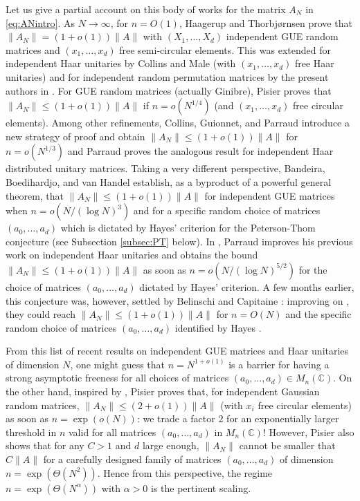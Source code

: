 \documentclass[11pt]{article}
\newcommand{\dC}{\mathbb {C}}
\newcommand{\1}{1\!\!{\sf I}}
\begin{document}
Let us give a partial account on this body of works for the matrix $A_N$ in \eqref{eq:ANintro}. As $N \to \infty$, for $n = O(1)$, Haagerup  and Thorbj{\o}rnsen 
 \cite{MR2183281} prove that $\|A_N\| = (1+o(1)) \| A\|$ with $(X_1,\ldots,X_d)$ independent GUE random matrices and $(x_1,\ldots,x_d)$ free semi-circular elements. This was extended for independent Haar unitaries by Collins and Male \cite{MR3205602} (with $(x_1,\ldots,x_d)$ free Haar unitaries) and for independent random permutation matrices by the present authors in \cite{MR4024563}. For GUE random matrices (actually Ginibre), Pisier \cite{MR4448584} proves that $\|A_N\| \leq (1+o(1)) \| A \|$ if $n = o(N^{1/4})$ (and $(x_1,\ldots,x_d)$ free circular elements). Among other refinements, Collins, Guionnet, and Parraud \cite{MR4445344} introduce a new strategy of proof and obtain $\|A_N\| \leq (1+o(1)) \| A\|$ for $n = o(N^{1/3})$ and Parraud \cite{MR4408503} proves the analogous result for independent Haar distributed unitary matrices. Taking a very different perspective, Bandeira, Boedihardjo, and van Handel \cite{bandeira2023matrix} establish, as a byproduct of a powerful general theorem, that $\|A_N\| \leq (1+o(1)) \| A \|$  for independent GUE matrices when $n = o (N / (\log N)^3)$ and for a specific random choice of matrices $(a_0,\ldots,a_d)$ which is dictated by Hayes' criterion \cite{MR4448584} for the Peterson-Thom conjecture (see Subsection \ref{subsec:PT} below). In \cite{parraud2023asymptotic}, Parraud improves his previous work on independent Haar unitaries and obtains the bound $\|A_N\| \leq (1+o(1)) \| A \|$ as soon as $n = o (N/(\log N)^{5/2})$ for the choice of matrices $(a_0,\ldots,a_d)$ dictated by Hayes' criterion. A few months earlier, this conjecture was, however, settled by Belinschi and Capitaine \cite{belinschi2022strong}: improving on  \cite{MR4445344}, they could reach $\|A_N\| \leq (1+o(1)) \| A \|$ for $n = O(N)$ and the specific random choice of matrices $(a_0,\ldots,a_d)$ identified by Hayes \cite{MR4448584}. 


From this list of recent results on independent GUE matrices and Haar unitaries of dimension $N$, one might guess that $n = N^{1+o(1)}$ is a barrier for having a strong asymptotic freeness for all choices of matrices $(a_0,\ldots,a_d) \in M_n(\dC)$. On the other hand, inspired by  \cite{MR1710376},  Pisier \cite[Corollary 4.7]{MR3273440}  proves that, for independent Gaussian random matrices, $\| A_N \| \leq (2+o(1)) \| A \|$ (with $x_i$ free circular elements) as soon as $n =  \exp (o(N) )$: we trade a factor $2$ for an exponentially larger threshold in $n$ valid for all matrices $(a_0,\ldots,a_d)$ in $M_n(\dC)$! However, Pisier also shows that for any $C >1$ and $d$ large enough, $\|A_N\|$ cannot be smaller that  $ C \|A \|$ for a carefully designed family of matrices $(a_0,\ldots,a_d)$ of dimension $n =  \exp( \Theta(N^2))$. Hence from this perspective, the regime $n =  \exp( \Theta(N^\alpha))$ with $\alpha >0$ is the pertinent scaling.
\end{document}
